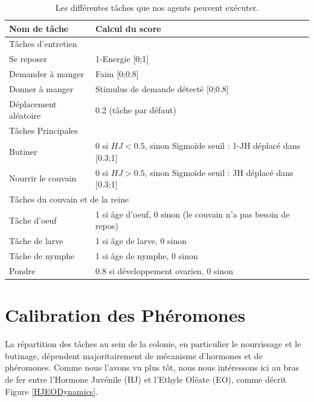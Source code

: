 		\begin{table}
        \centering
        \caption{Les différentes tâches que nos agents peuvent exécuter.}
        \begin{tabular}{|l|l|}
            \hline
            Nom de tâche & Calcul du score\\
            \hline
            \hline
            \multicolumn{2}{|l|}{Tâches d'entretien}\\
            \hline
            Se reposer & 1-Energie [0;1]\\
            Demander à manger & Faim [0;0.8] \\
            Donner à manger & Stimulus de demande détecté [0;0.8] \\
            Déplacement aléatoire & 0.2 (tâche par défaut) \\
            \hline
            \hline
            \multicolumn{2}{|l|}{Tâches Principales}\\
            \hline
            Butiner & 0 si $HJ<0.5$, sinon Sigmoïde seuil : 1-JH déplacé dans [0.3;1] \\
            Nourrir le couvain & 0 si $HJ>0.5$, sinon Sigmoïde seuil : JH déplacé dans [0.3;1] \\
            \hline
            \hline
            \multicolumn{2}{|l|}{Tâches du couvain et de la reine}\\
            \hline
            Tâche d'oeuf & 1 si âge d'oeuf, 0 sinon (le couvain n'a pas besoin de repos)\\
            Tâche de larve & 1 si âge de larve, 0 sinon\\
            Tâche de nymphe & 1 si âge de nymphe, 0 sinon \\
            Pondre & 0.8 si développement ovarien, 0 sinon\\
            \hline
            
        \end{tabular}
        \label{tableTasks}
    \end{table}
    
	\section{Calibration des Phéromones}
	
	La répartition des tâches au sein de la colonie, en particulier le nourrissage et le butinage, dépendent majoritairement de mécanisme d'hormones et de phéromones. Comme nous l'avons vu plus tôt, nous nous intéressons ici au bras de fer entre l'Hormone Juvénile (HJ) et l'Ethyle Oléate (EO), comme décrit Figure \ref{HJEODynamics}.
	
